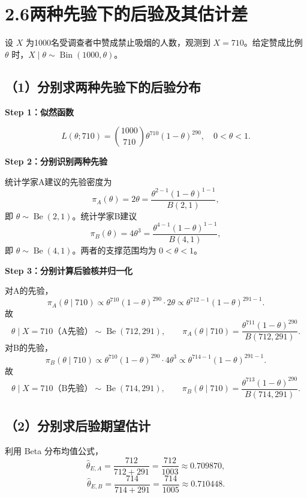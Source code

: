 \documentclass[UTF8,zihao=-4]{ctexart}
\newcommand{\step}[1]{\par\medskip\noindent\textbf{#1}\par\nopagebreak}
\newcommand{\Be}{\operatorname{Be}}
\begin{document}
\section*{2.6\quad 两种先验下的后验及其估计差}
设 $X$ 为1000名受调查者中赞成禁止吸烟的人数，观测到 $X=710$。给定赞成比例 $\theta$ 时，$X\mid\theta\sim\operatorname{Bin}(1000,\theta)$。

\subsection*{（1）分别求两种先验下的后验分布}
\step{Step 1：似然函数}
\[
L(\theta;710)=\binom{1000}{710}\theta^{710}(1-\theta)^{290},\quad0<\theta<1.
\]
\step{Step 2：分别识别两种先验}
统计学家A建议的先验密度为
\[
\pi_A(\theta)=2\theta
=\frac{\theta^{2-1}(1-\theta)^{1-1}}{B(2,1)},
\]
即 $\theta\sim\Be(2,1)$。统计学家B建议
\[
\pi_B(\theta)=4\theta^3
=\frac{\theta^{4-1}(1-\theta)^{1-1}}{B(4,1)},
\]
即 $\theta\sim\Be(4,1)$。两者的支撑范围均为 $0<\theta<1$。

\step{Step 3：分别计算后验核并归一化}
对A的先验，
\[
\pi_A(\theta\mid710)\propto\theta^{710}(1-\theta)^{290}\cdot2\theta
\propto\theta^{712-1}(1-\theta)^{291-1}.
\]
故
\[
\boxed{\theta\mid X=710\text{（A先验）}\sim\Be(712,291),}
\qquad\pi_A(\theta\mid710)=\frac{\theta^{711}(1-\theta)^{290}}{B(712,291)}.
\]
对B的先验，
\[
\pi_B(\theta\mid710)\propto\theta^{710}(1-\theta)^{290}\cdot4\theta^3
\propto\theta^{714-1}(1-\theta)^{291-1}.
\]
故
\[
\boxed{\theta\mid X=710\text{（B先验）}\sim\Be(714,291),}
\qquad\pi_B(\theta\mid710)=\frac{\theta^{713}(1-\theta)^{290}}{B(714,291)}.
\]

\subsection*{（2）分别求后验期望估计}
利用 Beta 分布均值公式，
\[
\boxed{\hat\theta_{E,A}=\frac{712}{712+291}=\frac{712}{1003}
\approx0.709870,}
\]
\[
\boxed{\hat\theta_{E,B}=\frac{714}{714+291}=\frac{714}{1005}
\approx0.710448.}
\]
\end{document}
